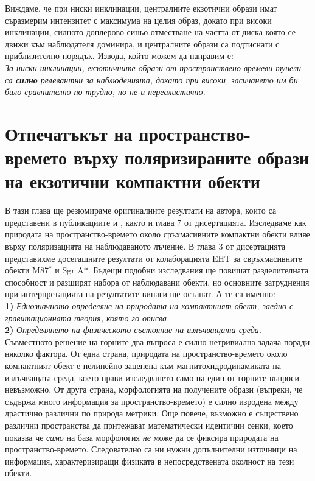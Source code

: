 \documentclass[12pt]{article}
\numberwithin{equation}{section}
\numberwithin{figure}{section}
\begin{document}
Виждаме, че при ниски инклинации, централните екзотични образи имат съразмерим интензитет с максимума на целия образ, докато при високи инклинации, силното доплерово синьо отместване на частта от диска която се движи към наблюдателя доминира, и централните образи са подтиснати с приблизително порядък. Извода, който можем да направим е:\\
	
\emph{За ниски инклинации, екзотичните образи от пространствено-времеви тунели са \textbf{силно} релевантни за наблюденията, докато при високи, засичането им би било сравнително по-трудно, но не и нереалистично.}
	
	\newpage
	
	\section{Отпечатъкът на пространство-времето върху поляризираните образи на екзотични компактни обекти}
	
	В тази глава ще резюмираме оригиналните резултати на автора, които са представени в публикациите \cite{Delijski2022} и \cite{Deliyski2023}, както и глава 7 от дисертацията. Изследваме как природата на пространство-времето около сръхмасивните компактни обекти влияе върху поляризацията на наблюдаваното лъчение. В глава 3 от дисертацията представихме досегашните резултати от колаборацията EHT за свръхмасивните обекти M87$^*$ и Sgr A$*$. Бъдещи подобни изследвания ще повишат разделителната способност и разширят набора от наблюдавани обекти, но основните затруднения при интерпретацията на резултатите винаги ще останат. А те са именно:\\
	
	\textbf{1)} \emph{Еднозначното определяне на природата на компактният обект, заедно с гравитационната теория, която го описва.}\\
	
	\textbf{2)} \emph{Определянето на физическото състояние на излъчващата среда.}\\
	
	Съвместното решение на горните два въпроса е силно нетривиална задача поради няколко фактора. От една страна, природата на пространство-времето около компактният обект е нелинейно зацепена към магнитохидродинамиката на излъчващата среда, което прави изследването само на един от горните въпроси невъзможно. От друга страна, морфологията на получените образи (въпреки, че съдържа много информация за пространство-времето) е силно изродена между драстично различни по природа метрики. Още повече, възможно е съществено различни пространства да притежават математически идентични сенки\cite{PhysRevD.103.084040}, което показва че \emph{само} на база морфология \emph{не} може да се фиксира природата на пространство-времето. Следователно са ни нужни допълнителни източници на информация, характеризиращи физиката в непосредствената околност на тези обекти. \\
	
\end{document}
